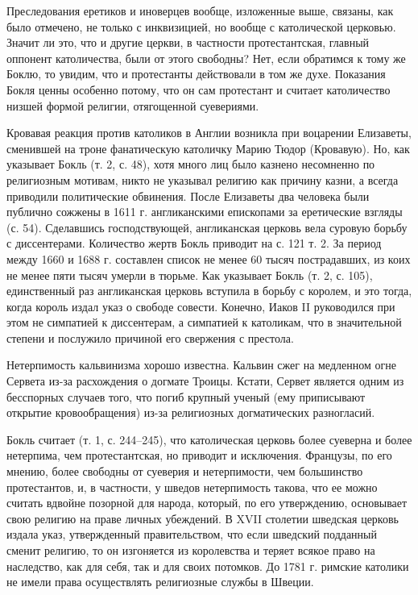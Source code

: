 Преследования еретиков  и иноверцев вообще, изложенные  выше, связаны,
как было отмечено,  не только с инквизицией, но  вообще с католической
церковью.  Значит   ли  это,   что  и   другие  церкви,   в  частности
протестантская, главный оппонент католичества, были от этого свободны?
Нет, если  обратимся к  тому же  Боклю, то  увидим, что  и протестанты
действовали в том же духе.  Показания Бокля ценны особенно потому, что
он  сам  протестант  и  считает католичество  низшей  формой  религии,
отягощенной суевериями.

Кровавая  реакция против  католиков  в Англии  возникла при  воцарении
Елизаветы,  сменившей  на  троне фанатическую  католичку  Марию  Тюдор
(Кровавую). Но, как указывает Бокль (т. 2, с. 48), хотя много лиц было
казнено несомненно  по религиозным мотивам, никто  не указывал религию
как причину  казни, а  всегда приводили политические  обвинения. После
Елизаветы два человека  были публично сожжены в  1611 г. англиканскими
епископами за еретические взгляды  (с. 54). Сделавшись господствующей,
англиканская церковь  вела суровую  борьбу с  диссентерами. Количество
жертв Бокль приводит  на с. 121 т.  2. За период между 1660  и 1688 г.
составлен  список не  менее 60  тысяч пострадавших,  из коих  не менее
пяти  тысяч умерли  в  тюрьме. Как  указывает Бокль  (т.  2, с.  105),
единственный раз англиканская  церковь вступила в борьбу  с королем, и
это тогда, когда  король издал указ о свободе  совести. Конечно, Иаков
II  руководился при  этом не  симпатией к  диссентерам, а  симпатией к
католикам,  что  в  значительной  степени  и  послужило  причиной  его
свержения с престола.

Нетерпимость кальвинизма  хорошо известна.  Кальвин сжег  на медленном
огне  Сервета  из-за  расхождения  о догмате  Троицы.  Кстати,  Сервет
является  одним   из  бесспорных  случаев  того,   что  погиб  крупный
ученый  (ему приписывают  открытие  кровообращения) из-за  религиозных
догматических разногласий.

Бокль  считает (т.  1, с.  244--245), что  католическая церковь  более
суеверна  и  более  нетерпима,   чем  протестантская,  но  приводит  и
исключения.  Французы, по  его мнению,  более свободны  от суеверия  и
нетерпимости, чем  большинство протестантов, и, в  частности, у шведов
нетерпимость такова, что ее можно считать вдвойне позорной для народа,
который, по его  утверждению, основывает свою религию  на праве личных
убеждений. В XVII столетии  шведская церковь издала указ, утвержденный
правительством,  что если  шведский  подданный сменит  религию, то  он
изгоняется из королевства и теряет всякое право на наследство, как для
себя, так и  для своих потомков. До 1781 г.  римские католики не имели
права осуществлять религиозные службы в Швеции.

